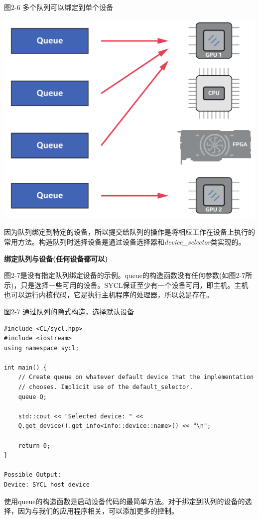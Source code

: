 \hspace*{\fill} \par %
图2-6 多个队列可以绑定到单个设备
\begin{center}
	\includegraphics[width=1.\textwidth]{content/chapter-2/images/5}
\end{center}

因为队列绑定到特定的设备，所以提交给队列的操作是将相应工作在设备上执行的常用方法。构造队列时选择设备是通过设备选择器和\textit{device\_selector}类实现的。\par

\hspace*{\fill} \par %
\textbf{绑定队列与设备(任何设备都可以)}

图2-7是没有指定队列绑定设备的示例。queue的构造函数没有任何参数(如图2-7所示)，只是选择一些可用的设备。SYCL保证至少有一个设备可用，即主机。主机也可以运行内核代码，它是执行主机程序的处理器，所以总是存在。\par

\hspace*{\fill} \par %
图2-7 通过队列的隐式构造，选择默认设备
\begin{lstlisting}[caption={}]
#include <CL/sycl.hpp>
#include <iostream>
using namespace sycl;

int main() {
	// Create queue on whatever default device that the implementation
	// chooses. Implicit use of the default_selector. 
	queue Q;
	
	std::cout << "Selected device: " <<
	Q.get_device().get_info<info::device::name>() << "\n";
	
	return 0;
}

Possible Output:
Device: SYCL host device
\end{lstlisting}	

使用queue的构造函数是启动设备代码的最简单方法。对于绑定到队列的设备的选择，因为与我们的应用程序相关，可以添加更多的控制。\par













